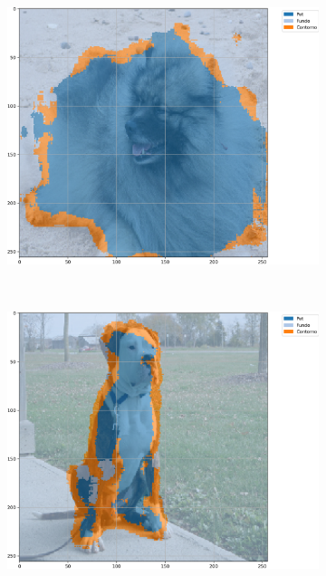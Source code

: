 \begin{figure}[H]
    \centering
    \caption{Exemplos segmentados a partir de U-Net-\textit{Like} com \textit{Max Pooling} e 500 épocas no conjunto de dados \textit{Oxford-IIIT Pets} baseada em acurácia.}
    \label{results:fig:semantic:11}
     \begin{subfigure}[t]{0.32\textwidth}
         \centering
         \includegraphics[width=1\linewidth]{recursos/imagens/results/max_acc_unetlike500_image_0_overlayed_segmentation.png}
         \label{results:fig:semantic:11.1}
     \end{subfigure}%
     ~ 
     \begin{subfigure}[t]{0.32\textwidth}
         \centering
         \includegraphics[width=1\linewidth]{recursos/imagens/results/max_acc_unetlike500_image_1_overlayed_segmentation.png}

\end{subfigure}
\end{figure}
